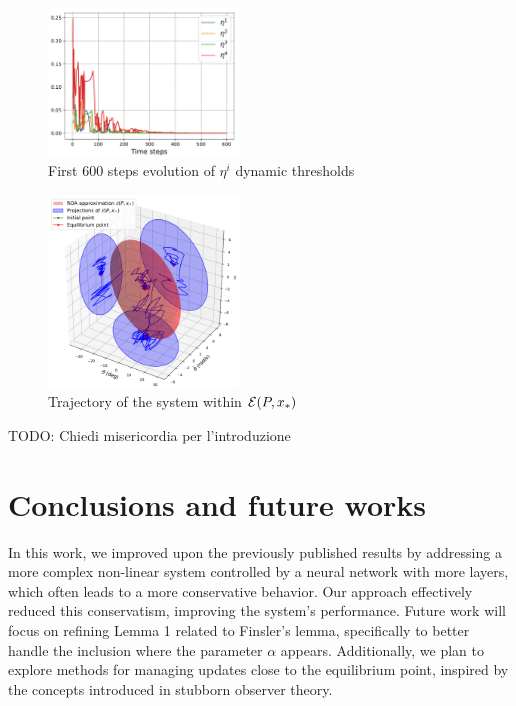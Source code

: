 \documentclass{ifacconf}
\theoremstyle{plain}
\begin{document}
\begin{figure}[H]
    \centering
    \includegraphics[width=0.45\textwidth]{Figures/eta_plot}
    \caption{First $600$ steps evolution of $\eta^i$ dynamic thresholds}
    \label{fig:eta}
\end{figure}

\begin{figure}[H]
    \centering
    \includegraphics[width=0.45\textwidth]{Figures/ellipsoid_plot}
    \caption{Trajectory of the system within ${\mathcal{E}}(P, x_*)$}
    \label{fig:ellipsoid}
\end{figure}


{\color{red} TODO: Chiedi misericordia per l'introduzione}

\section{Conclusions and future works}
In this work, we improved upon the previously published results by addressing a more complex non-linear system controlled by a neural network with more layers, which often leads to a more conservative behavior. Our approach effectively reduced this conservatism, improving the system's performance. Future work will focus on refining Lemma 1 related to Finsler's lemma, specifically to better handle the inclusion where the parameter $\alpha$ appears. Additionally, we plan to explore methods for managing updates close to the equilibrium point, inspired by the concepts introduced in stubborn observer theory.

%

\end{document}
